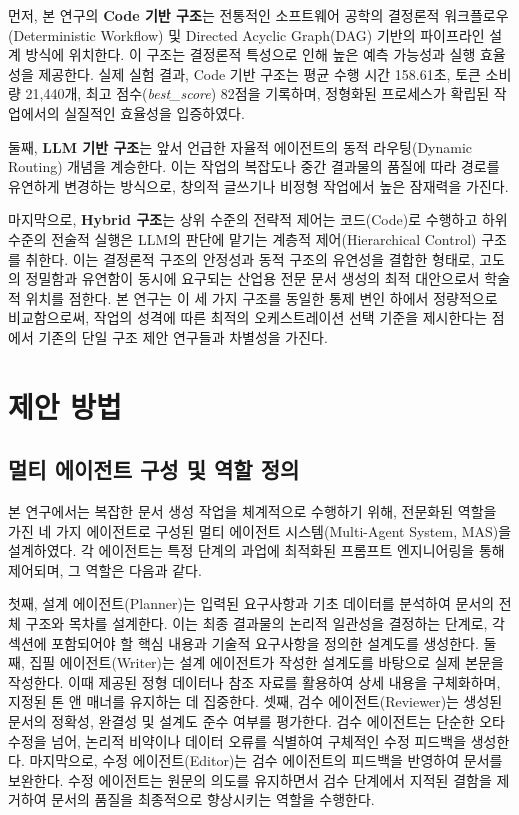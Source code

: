 \documentclass[10pt,twocolumn]{article}
\begin{document}
먼저, 본 연구의 \textbf{Code 기반 구조}는 전통적인 소프트웨어 공학의 결정론적 워크플로우(Deterministic Workflow) 및 Directed Acyclic Graph(DAG) 기반의 파이프라인 설계 방식에 위치한다. 이 구조는 결정론적 특성으로 인해 높은 예측 가능성과 실행 효율성을 제공한다. 실제 실험 결과, Code 기반 구조는 평균 수행 시간 158.61초, 토큰 소비량 21,440개, 최고 점수(\textit{best\_score}) 82점을 기록하며, 정형화된 프로세스가 확립된 작업에서의 실질적인 효율성을 입증하였다.

둘째, \textbf{LLM 기반 구조}는 앞서 언급한 자율적 에이전트의 동적 라우팅(Dynamic Routing) 개념을 계승한다. 이는 작업의 복잡도나 중간 결과물의 품질에 따라 경로를 유연하게 변경하는 방식으로, 창의적 글쓰기나 비정형 작업에서 높은 잠재력을 가진다.

마지막으로, \textbf{Hybrid 구조}는 상위 수준의 전략적 제어는 코드(Code)로 수행하고 하위 수준의 전술적 실행은 LLM의 판단에 맡기는 계층적 제어(Hierarchical Control) 구조를 취한다. 이는 결정론적 구조의 안정성과 동적 구조의 유연성을 결합한 형태로, 고도의 정밀함과 유연함이 동시에 요구되는 산업용 전문 문서 생성의 최적 대안으로서 학술적 위치를 점한다. 본 연구는 이 세 가지 구조를 동일한 통제 변인 하에서 정량적으로 비교함으로써, 작업의 성격에 따른 최적의 오케스트레이션 선택 기준을 제시한다는 점에서 기존의 단일 구조 제안 연구들과 차별성을 가진다.

\section{제안 방법}
\subsection{멀티 에이전트 구성 및 역할 정의}
본 연구에서는 복잡한 문서 생성 작업을 체계적으로 수행하기 위해, 전문화된 역할을 가진 네 가지 에이전트로 구성된 멀티 에이전트 시스템(Multi-Agent System, MAS)을 설계하였다. 각 에이전트는 특정 단계의 과업에 최적화된 프롬프트 엔지니어링을 통해 제어되며, 그 역할은 다음과 같다.

첫째, 설계 에이전트(Planner)는 입력된 요구사항과 기초 데이터를 분석하여 문서의 전체 구조와 목차를 설계한다. 이는 최종 결과물의 논리적 일관성을 결정하는 단계로, 각 섹션에 포함되어야 할 핵심 내용과 기술적 요구사항을 정의한 설계도를 생성한다. 둘째, 집필 에이전트(Writer)는 설계 에이전트가 작성한 설계도를 바탕으로 실제 본문을 작성한다. 이때 제공된 정형 데이터나 참조 자료를 활용하여 상세 내용을 구체화하며, 지정된 톤 앤 매너를 유지하는 데 집중한다. 셋째, 검수 에이전트(Reviewer)는 생성된 문서의 정확성, 완결성 및 설계도 준수 여부를 평가한다. 검수 에이전트는 단순한 오타 수정을 넘어, 논리적 비약이나 데이터 오류를 식별하여 구체적인 수정 피드백을 생성한다. 마지막으로, 수정 에이전트(Editor)는 검수 에이전트의 피드백을 반영하여 문서를 보완한다. 수정 에이전트는 원문의 의도를 유지하면서 검수 단계에서 지적된 결함을 제거하여 문서의 품질을 최종적으로 향상시키는 역할을 수행한다.
\end{document}
